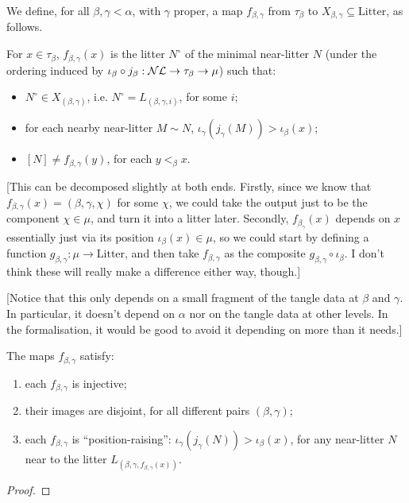 \begin{definition}
\label {def:f-map}
\leanok
We define, for all $\beta,\gamma < \alpha$, with $\gamma$ proper, a map $f_{\beta,\gamma}$ from $\tau_\beta$ to $X_{\beta,\gamma} \subseteq \mathrm{Litter}$, as follows.

For $x \in \tau_\beta$, $f_{\beta,\gamma}(x)$ is the litter $N^\circ$ of the minimal near-litter $N$ (under the ordering induced by $\iota_\beta \circ j_\beta : \mathcal{NL} \to \tau_\beta \to \mu$) such that:
\begin{itemize}
  \item $N^\circ\in X_{(\beta,\gamma)}$, i.e. $N^\circ = L_{(\beta,\gamma,i)}$, for some $i$;
  \item for each nearby near-litter $M \sim N$, $\iota_\gamma(j_\gamma(M)) >\iota_\beta(x)$;
  \item $[N] \neq f_{\beta,\gamma}(y)$, for each $y <_\beta x$.
\end{itemize}

[This can be decomposed slightly at both ends.  Firstly, since we know that $f_{\beta,\gamma}(x) = (\beta,\gamma,\chi)$ for some $\chi$, we could take the output just to be the component $\chi \in \mu$, and turn it into a litter later.  Secondly, $f_{\beta_\gamma}(x)$ depends on $x$ essentially just via its position $\iota_\beta(x) \in \mu$, so we could start by defining a function $g_{\beta,\gamma} : \mu \to \mathrm{Litter}$, and then take $f_{\beta,\gamma}$ as the composite $g_{\beta,\gamma} \circ \iota_\beta$.  I don’t think these will really make a difference either way, though.]

[Notice that this only depends on a small fragment of the tangle data at $\beta$ and $\gamma$. In particular, it doesn’t depend on $\alpha$ nor on the tangle data at other levels. In the formalisation, it would be good to avoid it depending on more than it needs.]
\end{definition}

\begin{lemma}
  \label{lem:f-map-properties}
  \leanok
  The maps $f_{\beta,\gamma}$ satisfy:
  \begin{enumerate}
  \item each $f_{\beta,\gamma}$ is injective;
  \item their images are disjoint, for all different pairs $(\beta,\gamma)$;
  \item each $f_{\beta,\gamma}$ is “position-raising”: $\iota_\gamma(j_\gamma(N)) > \iota_\beta(x)$, for any near-litter $N$ near to the litter $L_{(\beta,\gamma,f_{\beta,\gamma}(x))}$.
  \end{enumerate}
\end{lemma}
\begin{proof}\leanok\end{proof}

